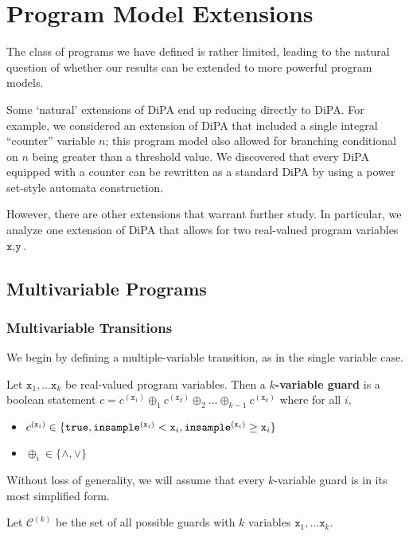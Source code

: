 
\section{Program Model Extensions}

The class of programs we have defined is rather limited, leading to the natural question of whether our results can be extended to more powerful program models. 

Some `natural' extensions of DiPA end up reducing directly to DiPA. For example, we considered an extension of DiPA that included a single integral ``counter'' variable $n$; this program model also allowed for branching conditional on $n$ being greater than a threshold value. 
We discovered that every DiPA equipped with a counter can be rewritten as a standard DiPA by using a power set-style automata construction. 

However, there are other extensions that warrant further study. In particular, we analyze one extension of DiPA that allows for two real-valued program variables $\texttt{x}, \texttt{y}$.

\subsection{Multivariable Programs}

\subsubsection{Multivariable Transitions}

We begin by defining a multiple-variable transition, as in the single variable case. 

\begin{defn}
    Let $\texttt{x}_1, \ldots \texttt{x}_k$ be real-valued program variables. Then a \textbf{$k$-variable guard} is a boolean statement $c = c^{(\texttt{x}_1)}\oplus_1 c^{(\texttt{x}_2)}\oplus_2\ldots\oplus_{k-1}c^{(\texttt{x}_k)}$ where for all $i$, \begin{itemize}
        \item $c^{(\texttt{x}_i)}\in \{\texttt{true}, \mvlguard[\texttt{x}_i], \mvgguard[\texttt{x}_i]\}$
        \item $\oplus_i \in \{\land, \lor\}$
    \end{itemize}
    Without loss of generality, we will assume that every $k$-variable guard is in its most simplified form. 
    
    

    Let $\mathcal{C}^{(k)}$ be the set of all possible guards with $k$ variables $\texttt{x}_1, \ldots \texttt{x}_k$.
\end{defn}

